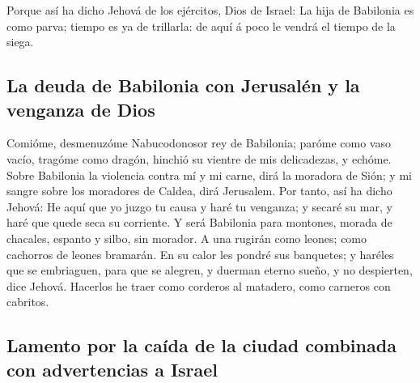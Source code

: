  Porque así ha dicho Jehová de los ejércitos, Dios de
Israel: La hija de Babilonia es como parva; tiempo es ya de trillarla:
de aquí á poco le vendrá el tiempo de la siega.

\hypertarget{la-deuda-de-babilonia-con-jerusaluxe9n-y-la-venganza-de-dios}{%
\subsection{La deuda de Babilonia con Jerusalén y la venganza de
Dios}\label{la-deuda-de-babilonia-con-jerusaluxe9n-y-la-venganza-de-dios}}

 Comióme, desmenuzóme Nabucodonosor rey de Babilonia;
paróme como vaso vacío, tragóme como dragón, hinchió su vientre de mis
delicadezas, y echóme.  Sobre Babilonia la violencia contra
mí y mi carne, dirá la moradora de Sión; y mi sangre sobre los moradores
de Caldea, dirá Jerusalem.  Por tanto, así ha dicho Jehová:
He aquí que yo juzgo tu causa y haré tu venganza; y secaré su mar, y
haré que quede seca su corriente.  Y será Babilonia para
montones, morada de chacales, espanto y silbo, sin morador.
 A una rugirán como leones; como cachorros de leones
bramarán.  En su calor les pondré sus banquetes; y haréles
que se embriaguen, para que se alegren, y duerman eterno sueño, y no
despierten, dice Jehová.  Hacerlos he traer como corderos
al matadero, como carneros con cabritos.

\hypertarget{lamento-por-la-cauxedda-de-la-ciudad-combinada-con-advertencias-a-israel}{%
\subsection{Lamento por la caída de la ciudad combinada con advertencias
a
Israel}\label{lamento-por-la-cauxedda-de-la-ciudad-combinada-con-advertencias-a-israel}}

